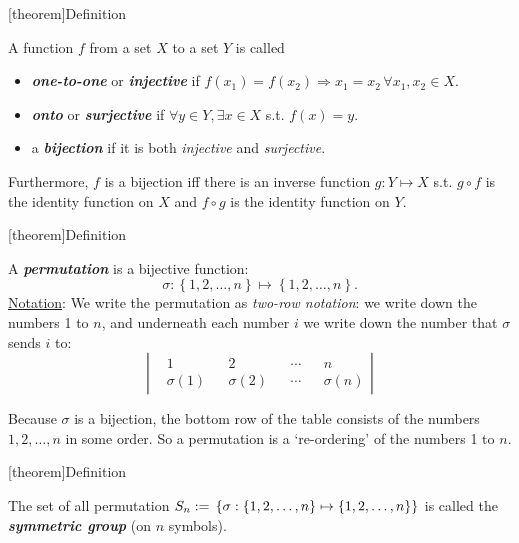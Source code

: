 \documentclass[12pt]{report}
\theoremstyle{definition}
\begin{document}
[theorem]{Definition}
\begin{function classification}
    A function $f$ from a set $X$ to a set $Y$ is called
    \begin{itemize}
            \item \textbf{\emph{one-to-one}} or \textbf{\emph{injective}} 
                if $f(x_1) = f(x_2) \Rightarrow{}x_1 = x_2 \,\forall x_1, x_2 \in{}X$.
                
            \item \textbf{\emph{onto}} or \textbf{\emph{surjective}} if
                $\forall y \in{}Y, \exists x \in{}X$ s.t. $f(x) = y$.

            \item a \textbf{\emph{bijection}} if it is both \emph{injective} and \emph{surjective}.
    \end{itemize}
\end{function classification}

Furthermore, $f$ is a bijection iff there is an inverse function $g: Y \mapsto X$
s.t. $g \circ f$ is the identity function on $X$ and $f \circ g$ is the identity function on $Y$.


[theorem]{Definition}
\begin{permutation}
    A \textbf{\emph{permutation}} is a bijective function:\[
        \sigma : \left\{1, 2, \ldots, n\right\} \mapsto \left\{1, 2, \ldots, n\right\}.
    \]
    \underline{Notation}: We write the permutation as \emph{two-row notation}:
    we write down the numbers 1 to $n$, and underneath each number $i$
    we write down the number that $\sigma$ sends $i$ to:\[
        \left|
        \begin{align*}
            & 1 && 2 && \cdots && n \\
            & \sigma(1) && \sigma(2) && \cdots && \sigma(n)
        \end{align*}
        \right| 
    \]
\end{permutation}

    Because $\sigma$ is a bijection, the bottom row of the table consists of the numbers
    $1, 2, \ldots, n$ in some order. So a permutation is a `re-ordering' of the numbers 1 to $n$.

[theorem]{Definition}
\begin{symmetric group}
    The set of all permutation $S_n := \\\left\{ \sigma : 
    \left\{1, 2, \ldots, n\right\}  \mapsto \left\{1, 2, \ldots, n\right\} \right\} $
    is called the \textbf{\emph{symmetric group}} (on $n$ symbols).
\end{symmetric group}
\end{document}
